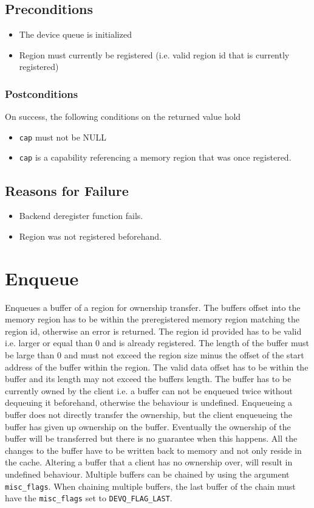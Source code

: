 \documentclass[a4paper,11pt,twoside]{report}
\begin{document}
	\subsection*{Preconditions}
	\begin{itemize}
		\item The device queue is initialized
		\item Region must currently be registered (i.e. valid region id that is currently registered)
	\end{itemize}
	\subsubsection*{Postconditions}
	On success, the following conditions on the returned value hold
	\begin{itemize}
		\item \texttt{cap} must not be NULL
		\item \texttt{cap} is a capability referencing a memory region that was once registered.
	\end{itemize}
	
	\subsection*{Reasons for Failure}
	\begin{itemize}
		\item Backend deregister function fails.
		\item Region was not registered beforehand. 
	\end{itemize}
	
	\section{Enqueue}
	Enqueues a buffer of a region for ownership transfer. The buffers offset into the memory region 
	has to be within the preregistered memory region matching the region id, otherwise an error is returned. 
	The region id provided has to be valid i.e. larger or equal than 0 and is already registered. 
	The length of the buffer must be large than 0 and must not
	exceed the region size minus the offset of the start address of the buffer within the 
	region. The valid data offset has to be within the buffer and its length may not exceed
	the buffers length. 
	The buffer has to be currently owned by the client i.e. a buffer 
	can not be enqueued twice without dequeuing it beforehand, otherwise the behaviour is undefined. 
	Enqueueing a buffer does not directly transfer the ownership, but the client
	enqueueing the buffer has given up ownership on the buffer. Eventually the ownership
	of the buffer will be transferred but there is no guarantee when this happens.
	All the changes to the buffer have to be written back to memory and not only 
	reside in the cache. Altering a buffer that a client has no ownership over, 
	will result in undefined behaviour. Multiple buffers can be chained by using 
	the argument \texttt{misc\_flags}. When chaining multiple buffers, the last buffer
	of the chain must have the \texttt{misc\_flags} set to \texttt{DEVQ\_FLAG\_LAST}.
	
\end{document}
